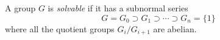 \documentclass{article}
\begin{document}
A group $G$ is {\em solvable} if it has a subnormal series
$$
G = G_0 \supset G_1 \supset \cdots \supset G_n = \{1\}
$$
where all the quotient groups $G_i/G_{i+1}$ are abelian.
\end{document}
